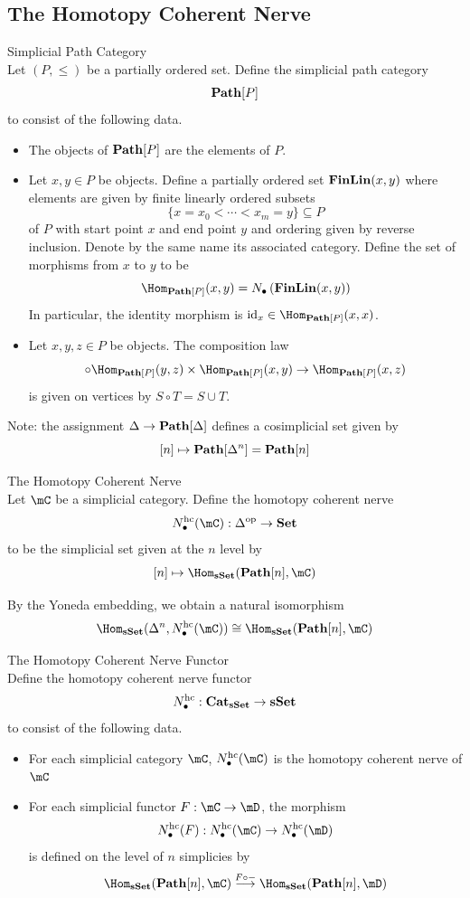 \documentclass[a4paper]{article}
\begin{document}
\subsection{The Homotopy Coherent Nerve}
\begin{defn}{Simplicial Path Category}{}\\ Let $(P,\leq)$ be a partially ordered set. Define the simplicial path category $$\bold{Path}[P]$$ to consist of the following data. 
\begin{itemize}
\item The objects of $\bold{Path}[P]$ are the elements of $P$. 
\item Let $x,y\in P$ be objects. Define a partially ordered set $\bold{FinLin}(x,y)$ where elements are given by finite linearly ordered subsets $$\{x=x_0<\cdots<x_m=y\}\subseteq P$$ of $P$ with start point $x$ and end point $y$ and ordering given by reverse inclusion. Denote by the same name its associated category. Define the set of morphisms from $x$ to $y$ to be $$\Hom_{\bold{Path}[P]}(x,y)=N_\bullet\left(\bold{FinLin}(x,y)\right)$$ In particular, the identity morphism is $\text{id}_x\in\Hom_{\bold{Path}[P]}(x,x)$. 
\item Let $x,y,z\in P$ be objects. The composition law $$\circ\Hom_{\bold{Path}[P]}(y,z)\times\Hom_{\bold{Path}[P]}(x,y)\to\Hom_{\bold{Path}[P]}(x,z)$$ is given on vertices by $S\circ T=S\cup T$. 
\end{itemize}
\end{defn}

Note: the assignment $\Delta\to\bold{Path}[\Delta]$ defines a cosimplicial set given by $$[n]\mapsto\bold{Path}[\Delta^n]=\bold{Path}[n]$$

\begin{defn}{The Homotopy Coherent Nerve}{}\\ Let $\mC$ be a simplicial category. Define the homotopy coherent nerve $$N_\bullet^\text{hc}(\mC):\Delta^\text{op}\to\bold{Set}$$ to be the simplicial set given at the $n$ level by $$[n]\mapsto\Hom_\bold{sSet}(\bold{Path}[n],\mC)$$
\end{defn}

By the Yoneda embedding, we obtain a natural isomorphism $$\Hom_\bold{sSet}(\Delta^n,N_\bullet^\text{hc}(\mC))\cong\Hom_\bold{sSet}(\bold{Path}[n],\mC)$$

\begin{defn}{The Homotopy Coherent Nerve Functor}{}\\ Define the homotopy coherent nerve functor $$N_\bullet^\text{hc}:\bold{Cat}_\bold{sSet}\to\bold{sSet}$$ to consist of the following data. 
\begin{itemize}
\item For each simplicial category $\mC$, $N_\bullet ^\text{hc}(\mC)$ is the homotopy coherent nerve of $\mC$
\item For each simplicial functor $F:\mC\to\mD$, the morphism $$N_\bullet^\text{hc}(F):N_\bullet^\text{hc}(\mC)\to N_\bullet^\text{hc}(\mD)$$ is defined on the level of $n$ simplicies by $$\Hom_\bold{sSet}(\bold{Path}[n],\mC)\overset{F\circ -}{\longrightarrow}\Hom_\bold{sSet}(\bold{Path}[n],\mD)$$
\end{itemize}
\end{defn}
\end{document}
